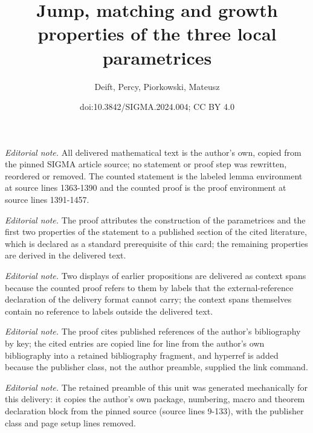 \documentclass[10pt,a4paper]{amsart}
\title{Jump, matching and growth properties of the three local parametrices}
\author{Deift, Percy, Piorkowski, Mateusz}
\date{doi:10.3842/SIGMA.2024.004; CC BY 4.0}
\numberwithin{equation}{section}
\begin{document}
\maketitle
\setcounter{section}{5}
\setcounter{Theorem}{1}
\noindent\textit{Editorial note.} All delivered mathematical text is the author's own, copied from the pinned SIGMA article source; no statement or proof step was rewritten, reordered or removed. The counted statement is the labeled lemma environment at source lines 1363-1390 and the counted proof is the proof environment at source lines 1391-1457.\par\medskip
\noindent\textit{Editorial note.} The proof attributes the construction of the parametrices and the first two properties of the statement to a published section of the cited literature, which is declared as a standard prerequisite of this card; the remaining properties are derived in the delivered text.\par\medskip
\noindent\textit{Editorial note.} Two displays of earlier propositions are delivered as context spans because the counted proof refers to them by labels that the external-reference declaration of the delivery format cannot carry; the context spans themselves contain no reference to labels outside the delivered text.\par\medskip
\noindent\textit{Editorial note.} The proof cites published references of the author's bibliography by key; the cited entries are copied line for line from the author's own bibliography into a retained bibliography fragment, and hyperref is added because the publisher class, not the author preamble, supplied the link command.\par\medskip
\noindent\textit{Editorial note.} The retained preamble of this unit was generated mechanically for this delivery: it copies the author's own package, numbering, macro and theorem declaration block from the pinned source (source lines 9-133), with the publisher class and page setup lines removed.\par\medskip
\end{document}
